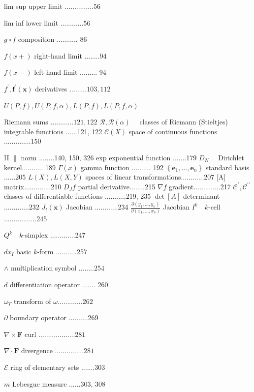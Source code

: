\documentclass[10pt]{article}
\begin{document}
lim sup upper limit $\ldots \ldots \ldots \ldots \ldots 56$

lim inf lower limit ............56

$g \circ f$ composition ........... 86

$f(x+)$ right-hand limit ........94

$f(x-)$ left-hand limit ......... 94

$f^{\prime}, \mathbf{f}^{\prime}(\mathbf{x})$ derivatives $\ldots \ldots \ldots 103,112$

$U(P, f), U(P, f, \alpha), L(P, f), L(P, f, \alpha)$

Riemann sums $\ldots \ldots \ldots \ldots 121,122$ $\mathscr{R}, \mathscr{R}(\alpha) \quad$ classes of Riemann (Stieltjes) integrable functions ......121, 122 $\mathscr{C}(X)$ space of continuous functions ..............150

II $\|$ norm ........140, 150, 326 exp exponential function .......179 $D_{N} \quad$ Dirichlet kernel........... 189 $\Gamma(x)$ gamma function .......... 192 $\left\{\mathbf{e}_{1}, \ldots, \mathbf{e}_{n}\right\}$ standard basis ......205 $L(X), L(X, Y)$ spaces of linear transformations............207 [A] matrix..............210 $D_{J} f$ partial derivative........215 $\nabla f$ gradient..............217 $\mathscr{C}^{\prime}, \mathscr{C}^{\prime \prime}$ classes of differentiable functions ...........219, 235 $\operatorname{det}[A]$ determinant $\ldots \ldots \ldots \ldots .232$ $J_{t}(\mathbf{x})$ Jacobian ............234 $\frac{\partial\left(y_{1}, \ldots, y_{n}\right)}{\partial\left(x_{1}, \ldots, x_{n}\right)}$ Jacobian
$I^{k} \quad k$-cell .................245

$Q^{k} \quad k$-simplex .............247

$d x_{I}$ basic $k$-form ...........257

$\wedge$ multiplication symbol ........254

$d$ differentiation operator ....... 260

$\omega_{T}$ transform of $\omega \ldots \ldots \ldots \ldots .262$

$\partial$ boundary operator ..........269

$\nabla \times \mathbf{F}$ curl $\ldots \ldots \ldots \ldots \ldots \ldots .281$

$\nabla \cdot \mathbf{F}$ divergence $\ldots \ldots \ldots \ldots \ldots 281$

$\mathscr{E}$ ring of elementary sets .......303

$m$ Lebesgue measure ......303, 308
\end{document}
